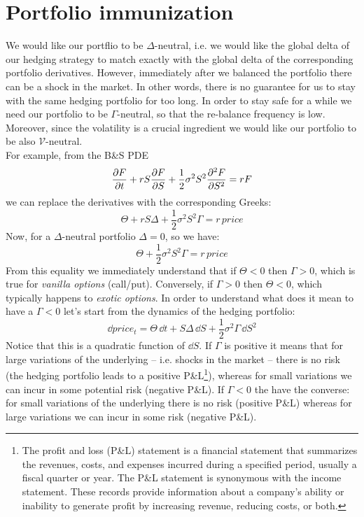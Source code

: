 \section{Portfolio immunization}
We would like our portflio to be $\Delta$-neutral, i.e. we would like the global delta of our hedging strategy to match exactly with the global delta of the corresponding portfolio derivatives. However, immediately after we balanced the portfolio there can be a shock in the market. In other words, there is no guarantee for us to stay with the same hedging portfolio for too long. In order to stay safe for a while we need our portfolio to be $\Gamma$-neutral, so that the re-balance frequency is low. Moreover, since the volatility is a crucial ingredient we would like our portfolio to be also $\mathcal{V}$-neutral.\\
For example, from the B\&S PDE
\begin{equation}
    \pdv{F}{t} + rS\pdv{F}{S} + \frac{1}{2}\sigma^2S^2\pdv[2]{F}{S} = rF
\end{equation}
we can replace the derivatives with the corresponding Greeks:
\begin{equation}
    \Theta + rS\Delta + \frac{1}{2}\sigma^2S^2 \Gamma = r\, price
\end{equation}
Now, for a $\Delta$-neutral portfolio $\Delta = 0$, so we have:
\begin{equation}
    \Theta + \frac{1}{2}\sigma^2S^2 \Gamma = r\, price
\end{equation}
From this equality we immediately understand that if $\Theta<0$ then $\Gamma>0$, which is true for \emph{vanilla options} (call/put). Conversely, if $\Gamma>0$ then $\Theta<0$, which typically happens to \emph{exotic options}. In order to understand what does it mean to have a $\Gamma<0$ let's start from the dynamics of the hedging portfolio:
\begin{equation}
    \dd price_t = \Theta\,\dd t + S\Delta\,\dd S + \frac{1}{2}\sigma^2\Gamma\,\dd S^2
\end{equation}
Notice that this is a quadratic function of $\dd S$. If $\Gamma$ is positive it means that for large variations of the underlying -- i.e. shocks in the market -- there is no risk (the hedging portfolio leads to a positive P\&L\footnote{The profit and loss (P\&L) statement is a financial statement that summarizes the revenues, costs, and expenses incurred during a specified period, usually a fiscal quarter or year. The P\&L statement is synonymous with the income statement. These records provide information about a company's ability or inability to generate profit by increasing revenue, reducing costs, or both.}), whereas for small variations we can incur in some potential risk (negative P\&L). If $\Gamma<0$ the have the converse: for small variations of the underlying there is no risk (positive P\&L) whereas for large variations we can incur in some risk (negative P\&L).
